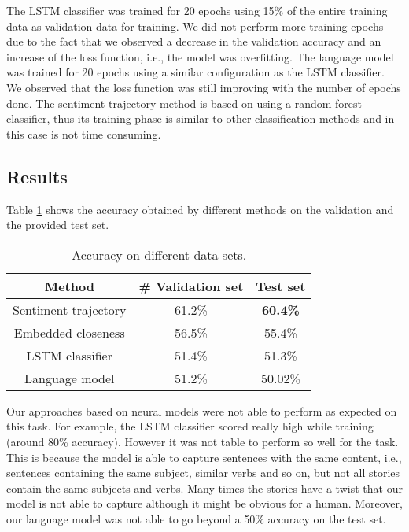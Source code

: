 \documentclass{article}
\newcommand{\lstm}{LSTM }
\begin{document}
The \lstm classifier was trained for 20 epochs using 15\% of the entire training
data as validation data for training. We did not perform more training epochs
due to the fact that we observed a decrease in the validation accuracy and an
increase of the loss function, i.e., the model was overfitting.  The language
model was trained for 20 epochs using a similar configuration as the \lstm
classifier. We observed that the loss function was still improving with the
number of epochs done. The sentiment trajectory method is based on using a
random forest classifier, thus its training phase is similar to other
classification methods and in this case is not time consuming.

\subsection{Results}
\label{subsec:results}

Table \ref{tab:results} shows the accuracy obtained by different methods on the
validation and the provided test set. 

\begin{table}
    \caption{Accuracy on different data sets.}
    \begin{center}
        \label{tab:results}
        \begin{tabular}{||c c c||} 
            \hline
            Method                 & \# Validation set         & Test set \\ [0.5ex] 
            \hline\hline
            Sentiment trajectory   & 61.2\%                    & \textbf{60.4\%} \\ 
            \hline
            Embedded closeness     & 56.5\%                    & 55.4\% \\
            \hline
            LSTM classifier        & 51.4\%                    & 51.3\% \\ 
            \hline
            Language model         & 51.2\%                    & 50.02\% \\ [1ex] 
            \hline
        \end{tabular}
    \end{center}
\end{table}

Our approaches based on neural models were not able to perform as expected on
this task. For example, the \lstm classifier scored really high while training
(around 80\% accuracy). However it was not table to perform so well for the
task. This is because the model is able to capture sentences with the same
content, i.e., sentences containing the same subject, similar verbs and so on,
but not all stories contain the same subjects and verbs. Many times the stories
have a twist that our model is not able to capture although it might be obvious
for a human. Moreover, our language model was not able to go beyond a 50\%
accuracy on the test set. 
\end{document}
